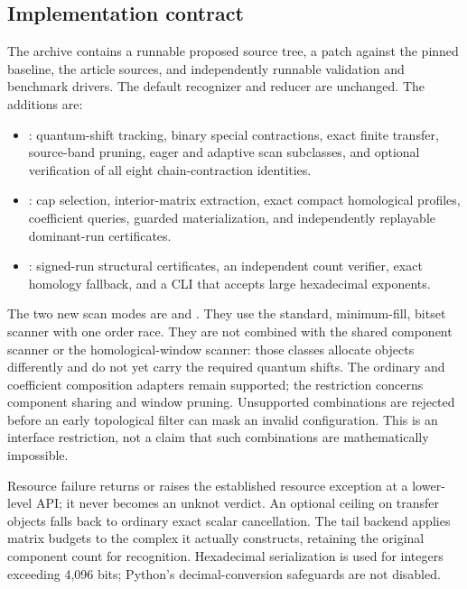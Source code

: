 \subsection{Implementation contract}
The archive contains a runnable proposed  source tree, a patch against the pinned baseline, the article sources, and independently runnable validation and benchmark drivers. The default recognizer and reducer are unchanged. The additions are:
\begin{itemize}
\item {}: quantum-shift tracking, binary special contractions, exact finite transfer, source-band pruning, eager and adaptive scan subclasses, and optional verification of all eight chain-contraction identities.
\item {}: cap selection, interior-matrix extraction, exact compact homological profiles, coefficient queries, guarded materialization, and independently replayable dominant-run certificates.
\item {}: signed-run structural certificates, an independent count verifier, exact homology fallback, and a CLI that accepts large hexadecimal exponents.
\end{itemize}

The two new scan modes are  and . They use the standard, minimum-fill, bitset scanner with one order race. They are not combined with the shared component scanner or the homological-window scanner: those classes allocate objects differently and do not yet carry the required quantum shifts. The ordinary  and  coefficient composition adapters remain supported; the restriction concerns component sharing and window pruning. Unsupported combinations are rejected before an early topological filter can mask an invalid configuration. This is an interface restriction, not a claim that such combinations are mathematically impossible.

Resource failure returns  or raises the established resource exception at a lower-level API; it never becomes an unknot verdict. An optional ceiling on transfer objects falls back to ordinary exact scalar cancellation. The tail backend applies matrix budgets to the complex it actually constructs, retaining the original component count for recognition. Hexadecimal serialization is used for integers exceeding 4,096 bits; Python's decimal-conversion safeguards are not disabled.

